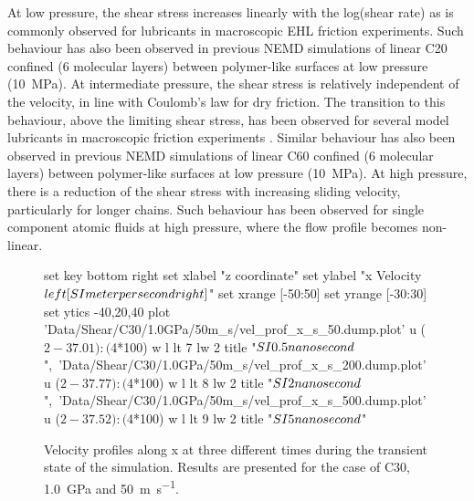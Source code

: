 \documentclass[aps,prb,reprint,superscriptaddress, a4paper]{revtex4-1}
\begin{document}
At low pressure, the shear stress increases linearly with the log(shear rate) as is commonly observed for lubricants in macroscopic EHL friction experiments\cite{Ewen2017a}. Such behaviour has also been observed in previous NEMD simulations of linear C20 confined (6 molecular layers) between polymer-like surfaces at low pressure (\SI{10}{\mega\pascal})\cite{Sivebaek2010}. At intermediate pressure, the shear stress is relatively independent of the velocity, in line with Coulomb's law for dry friction. The transition to this behaviour, above the limiting shear stress, has been observed for several model lubricants in macroscopic friction experiments \cite{Martinie2016a}. Similar behaviour has also been observed in previous NEMD simulations of linear C60 confined (6 molecular layers) between polymer-like surfaces at low pressure (\SI{10}{\mega\pascal})\cite{Sivebaek2010}. At high pressure, there is a reduction of the shear stress with increasing sliding velocity, particularly for longer chains. Such behaviour has been observed for single component atomic fluids at high pressure, where the flow profile becomes non-linear\cite{Heyes2012,Gattinoni2013,Mackowiak2016}.

\begin{figure}
    	\begin{center}
		\begin{gnuplot}[terminal=pdf, terminaloptions={size \SERFigwidth cm, \SERFigheight cm color solid}]

			set key bottom right
			set xlabel "z coordinate"  
			set ylabel "x Velocity $\\left[ \\SI{}{\\meter\\per\\second} \\right]$"
			set xrange [-50:50]
			set yrange [-30:30]
			set ytics -40,20,40
			plot  	'Data/Shear/C30/1.0GPa/50m_s/vel_prof_x_s_50.dump.plot' u ($2-37.01):($4*100) w l  lt 7 lw 2  title               "$\\SI{0.5}{\\nano\\second}$",\
					'Data/Shear/C30/1.0GPa/50m_s/vel_prof_x_s_200.dump.plot' u ($2-37.77):($4*100) w l  lt 8 lw 2  title     "$\\SI{2}{\\nano\\second}$",\
					'Data/Shear/C30/1.0GPa/50m_s/vel_prof_x_s_500.dump.plot' u ($2-37.52):($4*100) w l  lt 9 lw 2  title     "$\\SI{5}{\\nano\\second}$"
					
		\end{gnuplot}
		\caption{Velocity profiles along x at three different times during the transient state of the simulation. Results are presented for the case of  C30,  \SI{1.0}{\giga\pascal} and  \SI{50}{\meter\per\second}.}
		\label{fig:VelProf_MDP}
	\end{center}
 \end{figure}
\end{document}
